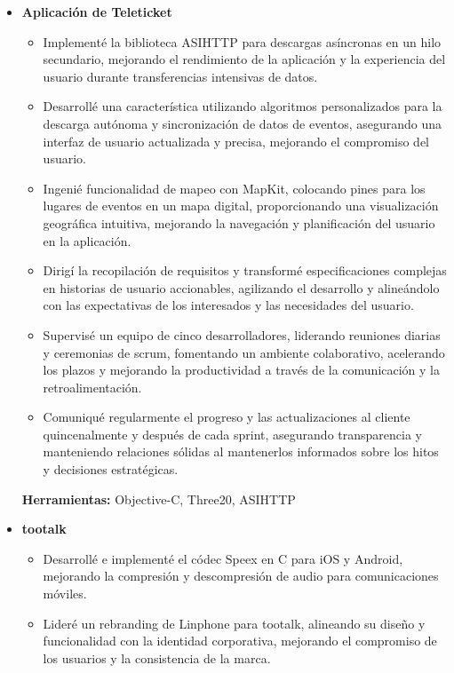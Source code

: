 \documentclass[11pt,a4paper,english]{moderncv}
\begin{document}
{
\begin{itemize}
    \item \textbf{Aplicación de Teleticket}
        \begin{itemize}
            \item Implementé la biblioteca ASIHTTP para descargas asíncronas en un hilo secundario, mejorando el rendimiento de la aplicación y la experiencia del usuario durante transferencias intensivas de datos.
            \item Desarrollé una característica utilizando algoritmos personalizados para la descarga autónoma y sincronización de datos de eventos, asegurando una interfaz de usuario actualizada y precisa, mejorando el compromiso del usuario.
            \item Ingenié funcionalidad de mapeo con MapKit, colocando pines para los lugares de eventos en un mapa digital, proporcionando una visualización geográfica intuitiva, mejorando la navegación y planificación del usuario en la aplicación.
            \item Dirigí la recopilación de requisitos y transformé especificaciones complejas en historias de usuario accionables, agilizando el desarrollo y alineándolo con las expectativas de los interesados y las necesidades del usuario.
            \item Supervisé un equipo de cinco desarrolladores, liderando reuniones diarias y ceremonias de scrum, fomentando un ambiente colaborativo, acelerando los plazos y mejorando la productividad a través de la comunicación y la retroalimentación.
            \item Comuniqué regularmente el progreso y las actualizaciones al cliente quincenalmente y después de cada sprint, asegurando transparencia y manteniendo relaciones sólidas al mantenerlos informados sobre los hitos y decisiones estratégicas.
        \end{itemize}
        \textbf{Herramientas:} Objective-C, Three20, ASIHTTP
    \item \textbf{tootalk}
        \begin{itemize}
            \item Desarrollé e implementé el códec Speex en C para iOS y Android, mejorando la compresión y descompresión de audio para comunicaciones móviles.
            \item Lideré un rebranding de Linphone para tootalk, alineando su diseño y funcionalidad con la identidad corporativa, mejorando el compromiso de los usuarios y la consistencia de la marca.

\end{itemize}
\end{itemize}}
\end{document}
